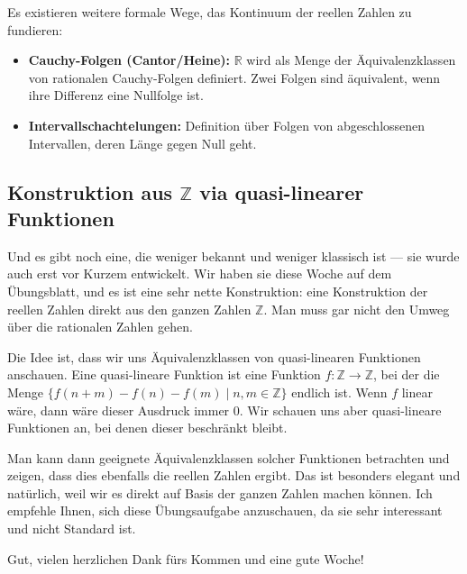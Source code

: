 \begin{math-stroke}
Es existieren weitere formale Wege, das Kontinuum der reellen Zahlen zu fundieren:
\begin{itemize}
    \item \textbf{Cauchy-Folgen (Cantor/Heine):} $\mathbb{R}$ wird als Menge der Äquivalenzklassen von rationalen Cauchy-Folgen definiert. Zwei Folgen sind äquivalent, wenn ihre Differenz eine Nullfolge ist.
    \item \textbf{Intervallschachtelungen:} Definition über Folgen von abgeschlossenen Intervallen, deren Länge gegen Null geht.
\end{itemize}
\end{math-stroke}

\subsection{Konstruktion aus \texorpdfstring{$\mathbb{Z}$}{Z} via quasi-linearer Funktionen}

\begin{spoken-clean}[01:21:10 - 01:21:17]
Und es gibt noch eine, die weniger bekannt und weniger klassisch ist --- sie wurde auch erst vor Kurzem entwickelt. Wir haben sie diese Woche auf dem Übungsblatt, und es ist eine sehr nette Konstruktion: eine Konstruktion der reellen Zahlen direkt aus den ganzen Zahlen $\mathbb{Z}$. Man muss gar nicht den Umweg über die rationalen Zahlen gehen.

Die Idee ist, dass wir uns Äquivalenzklassen von quasi-linearen Funktionen anschauen. Eine quasi-lineare Funktion ist eine Funktion $f \colon \mathbb{Z} \to \mathbb{Z}$, bei der die Menge $\{ f(n+m) - f(n) - f(m) \mid n, m \in \mathbb{Z} \}$ endlich ist. Wenn $f$ linear wäre, dann wäre dieser Ausdruck immer $0$. Wir schauen uns aber quasi-lineare Funktionen an, bei denen dieser  beschränkt bleibt.

Man kann dann geeignete Äquivalenzklassen solcher Funktionen betrachten und zeigen, dass dies ebenfalls die reellen Zahlen ergibt. Das ist besonders elegant und natürlich, weil wir es direkt auf Basis der ganzen Zahlen machen können. Ich empfehle Ihnen, sich diese Übungsaufgabe anzuschauen, da sie sehr interessant und nicht Standard ist.

Gut, vielen herzlichen Dank fürs Kommen und eine gute Woche!
\end{spoken-clean}

